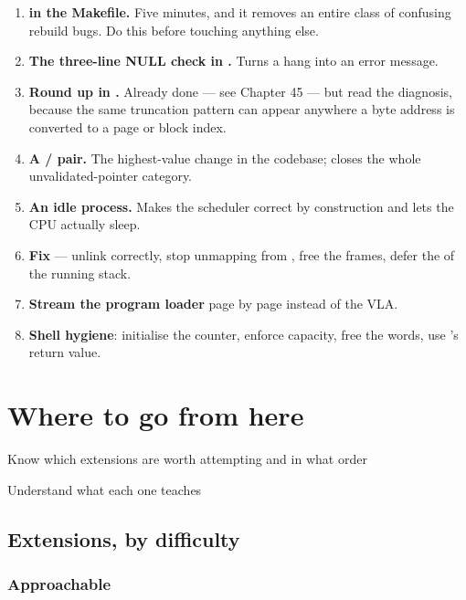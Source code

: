 \begin{enumerate}
  \item \textbf{ in the Makefile.} Five minutes, and it removes an entire class of
        confusing rebuild bugs. Do this before touching anything else.
  \item \textbf{The three-line NULL check in .} Turns a hang into an error message.
  \item \textbf{Round up in .} Already done --- see Chapter 45 --- but read the
        diagnosis, because the same truncation pattern can appear anywhere a byte address is
        converted to a page or block index.
  \item \textbf{A  /  pair.} The highest-value change in
        the codebase; closes the whole unvalidated-pointer category.
  \item \textbf{An idle process.} Makes the scheduler correct by construction and lets the CPU
        actually sleep.
  \item \textbf{Fix } --- unlink correctly, stop unmapping from
        , free the frames, defer the  of the running stack.
  \item \textbf{Stream the program loader} page by page instead of the VLA.
  \item \textbf{Shell hygiene}: initialise the counter, enforce capacity, free the words, use
        's return value.
\end{enumerate}

\chapter{Where to go from here}

\begin{goals}
  \item Know which extensions are worth attempting and in what order
  \item Understand what each one teaches
\end{goals}

\section{Extensions, by difficulty}

\subsection{Approachable}

